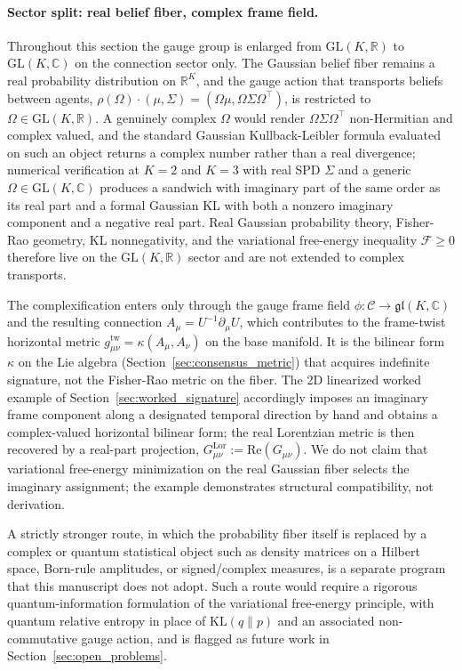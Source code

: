 \documentclass[11pt]{article}
\begin{document}
\paragraph{Sector split: real belief fiber, complex frame field.}
Throughout this section the gauge group is enlarged from $\mathrm{GL}(K, \mathbb{R})$ to $\mathrm{GL}(K, \mathbb{C})$ on the connection sector only. The Gaussian belief fiber remains a real probability distribution on $\mathbb{R}^K$, and the gauge action that transports beliefs between agents, $\rho(\Omega) \cdot (\mu, \Sigma) = (\Omega \mu, \Omega \Sigma \Omega^\top)$, is restricted to $\Omega \in \mathrm{GL}(K, \mathbb{R})$. A genuinely complex $\Omega$ would render $\Omega \Sigma \Omega^\top$ non-Hermitian and complex valued, and the standard Gaussian Kullback-Leibler formula evaluated on such an object returns a complex number rather than a real divergence; numerical verification at $K=2$ and $K=3$ with real SPD $\Sigma$ and a generic $\Omega \in \mathrm{GL}(K, \mathbb{C})$ produces a sandwich with imaginary part of the same order as its real part and a formal Gaussian KL with both a nonzero imaginary component and a negative real part. Real Gaussian probability theory, Fisher-Rao geometry, KL nonnegativity, and the variational free-energy inequality $\mathcal{F} \ge 0$ therefore live on the $\mathrm{GL}(K, \mathbb{R})$ sector and are not extended to complex transports.

The complexification enters only through the gauge frame field $\phi: \mathcal{C} \to \mathfrak{gl}(K, \mathbb{C})$ and the resulting connection $A_\mu = U^{-1} \partial_\mu U$, which contributes to the frame-twist horizontal metric $g^{\mathrm{tw}}_{\mu\nu} = \kappa(A_\mu, A_\nu)$ on the base manifold. It is the bilinear form $\kappa$ on the Lie algebra (Section~\ref{sec:consensus_metric}) that acquires indefinite signature, not the Fisher-Rao metric on the fiber. The 2D linearized worked example of Section~\ref{sec:worked_signature} accordingly imposes an imaginary frame component along a designated temporal direction by hand and obtains a complex-valued horizontal bilinear form; the real Lorentzian metric is then recovered by a real-part projection, $G^{\mathrm{Lor}}_{\mu\nu} := \mathrm{Re}(G_{\mu\nu})$. We do not claim that variational free-energy minimization on the real Gaussian fiber selects the imaginary assignment; the example demonstrates structural compatibility, not derivation.

A strictly stronger route, in which the probability fiber itself is replaced by a complex or quantum statistical object such as density matrices on a Hilbert space, Born-rule amplitudes, or signed/complex measures, is a separate program that this manuscript does not adopt. Such a route would require a rigorous quantum-information formulation of the variational free-energy principle, with quantum relative entropy in place of $\mathrm{KL}(q \| p)$ and an associated non-commutative gauge action, and is flagged as future work in Section~\ref{sec:open_problems}.
\end{document}
